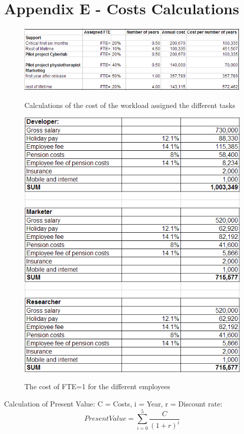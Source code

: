 \section*{Appendix E - Costs Calculations}
\label{E}
\begin{figure}[h]
\begin{center}
\includegraphics[scale=0.8]{calcFTE}
\label{fig:fte}
\caption{Calculations of the cost of the workload assigned the different tasks}
\end{center}
\end{figure}
\bigskip
\bigskip
\bigskip
\bigskip
\bigskip
\bigskip
\begin{figure}
\begin{center}
\includegraphics[scale=0.7]{appendixlonn}
\label{fig:employee}
\caption{The cost of FTE=1 for the different employees}
\end{center}
\end{figure}
Calculation of Present Value:
C = Costs,
i = Year,
r = Discount rate:
\begin{equation}
Present Value = \sum_{i=0}^{5} \frac{C}{(1+r)^i}
\end{equation}

